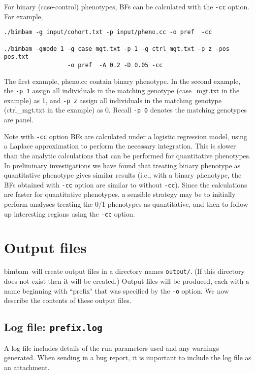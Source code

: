 \documentclass[11pt,Palatino]{article}
\def\bimbam{{\sc bimbam}~}
\begin{document}
For binary (case-control) phenotypes, BFs can be calculated with the {\tt -cc} option.
For example,
\begin{verbatim}
./bimbam -g input/cohort.txt -p input/pheno.cc -o pref  -cc 

./bimbam -gmode 1 -g case_mgt.txt -p 1 -g ctrl_mgt.txt -p z -pos pos.txt
                  -o pref  -A 0.2 -D 0.05 -cc  
\end{verbatim}
The first example, pheno.cc contain binary phenotype. In the second example, 
the {\tt -p 1} assign all individuals in the matching genotype (case\_mgt.txt in the example) as 1, and {\tt -p z} assign all individuals in the matching genotype (ctrl\_mgt.txt in the example) as 0. Recall {\tt -p 0} denotes the matching genotypes are panel.    

Note with {\tt -cc} option BFs are calculated under a logistic regression  model, using a Laplace approximation to perform the necessary integration. This is slower than the analytic  calculations that can be performed for quantitative phenotypes.
In preliminary investigations we have found that treating binary phenotype as quantitative phenotype gives similar results
(i.e., with a binary phenotype, the BFs obtained with {\tt -cc} option are similar to without {\tt -cc}). Since the calculations are faster for quantitative phenotypes, a sensible strategy may be to initially
perform analyses treating the 0/1 phenotypes as quantitative, and then to follow up
interesting regions using the {\tt -cc} option.




\section{Output files } \label{output}

\bimbam will create output files in a directory names {\tt output/}. (If this directory does not exist then it will be created.)  Output files will be produced, each with a name beginning with ``prefix" that was specified by the {\tt -o} option. We now describe the contents of these output files.

\subsection{Log file: {\tt prefix.log}}
A log file includes details of the run parameters used and any warnings generated.
When sending in a bug report, it is important to include the log file as an attachment. 
\end{document}
